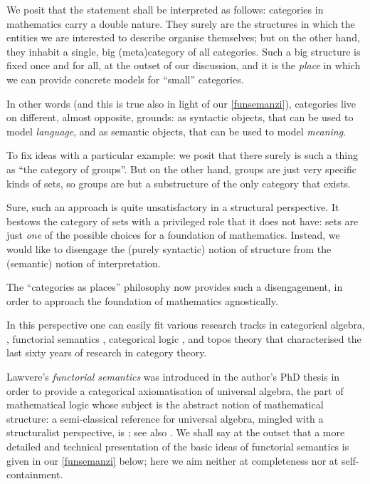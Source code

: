 We posit that the statement shall be interpreted as follows: categories in mathematics carry a double nature. They surely are the structures in which the entities we are interested to describe organise themselves; but on the other hand, they inhabit a single, big (meta)category of all categories. Such a big structure is fixed once and for all, at the outset of our discussion, and it is the \emph{place} in which we can provide concrete models for ``small'' categories.

In other words (and this is true also in light of our \autoref{funsemanzi}), categories live on different, almost opposite, grounds: as syntactic objects, that can be used to model \emph{language}, and as semantic objects, that can be used to model \emph{meaning}.

To fix ideas with a particular example: we posit that there surely is such a thing as ``the category of groups''. But on the other hand, groups are just very specific kinds of sets, so groups are but a substructure of the only category that exists.

Sure, such an approach is quite unsatisfactory in a structural perspective. It bestows the category of sets with a privileged role that it does not have: sets are just \emph{one} of the possible choices for a foundation of mathematics. Instead, we would like to disengage the (purely syntactic) notion of structure from the (semantic) notion of interpretation.

The ``categories as places'' philosophy now provides such a disengagement, in order to approach the foundation of mathematics agnostically.%

In this perspective one can easily fit various research tracks in categorical algebra, \cite{Janelidze2004}, functorial semantics \cite{lawvere1963functorial,hyland2007category}, categorical logic \cite{lambek1988introduction}, and topos theory \cite{JohnstonePT} that characterised the last sixty years of research in category theory.

Lawvere's \emph{functorial semantics} was introduced in the author's PhD thesis \cite{lawvere1963functorial} in order to provide a categorical axiomatisation of universal algebra, the part of mathematical logic whose subject is the abstract notion of mathematical structure: a semi-classical reference for universal algebra, mingled with a structuralist perspective, is \cite{manes2012algebraic}; see also \cite{sankappanavar}. We shall say at the outset that a more detailed and technical presentation of the basic ideas of functorial semantics is given in our \autoref{funsemanzi} below; here we aim neither at completeness nor at self-containment.

